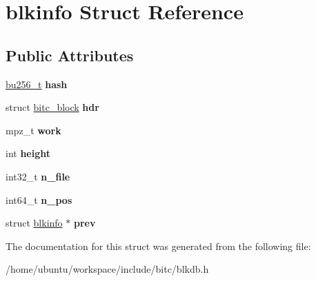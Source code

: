 \hypertarget{structblkinfo}{\section{blkinfo Struct Reference}
\label{structblkinfo}
}
\subsection*{Public Attributes}
\begin{DoxyCompactItemize}
\item 
\hypertarget{structblkinfo_acb979659f0946d2f6b89512f7b112e83}{\hyperlink{structbu256}{bu256\-\_\-t} {\bfseries hash}}\label{structblkinfo_acb979659f0946d2f6b89512f7b112e83}

\item 
\hypertarget{structblkinfo_ae323509169e136e40c53d9298d13818d}{struct \hyperlink{structbitc__block}{bitc\-\_\-block} {\bfseries hdr}}\label{structblkinfo_ae323509169e136e40c53d9298d13818d}

\item 
\hypertarget{structblkinfo_ac7b3f6aa68e8b3230fc1061e056b643f}{mpz\-\_\-t {\bfseries work}}\label{structblkinfo_ac7b3f6aa68e8b3230fc1061e056b643f}

\item 
\hypertarget{structblkinfo_a342e96e895940f919b7488d55d75d555}{int {\bfseries height}}\label{structblkinfo_a342e96e895940f919b7488d55d75d555}

\item 
\hypertarget{structblkinfo_a153d3e6b4c9f34d5b24cf5b612bbd83c}{int32\-\_\-t {\bfseries n\-\_\-file}}\label{structblkinfo_a153d3e6b4c9f34d5b24cf5b612bbd83c}

\item 
\hypertarget{structblkinfo_a81e082905848657b5e13f1b9c9a81e7e}{int64\-\_\-t {\bfseries n\-\_\-pos}}\label{structblkinfo_a81e082905848657b5e13f1b9c9a81e7e}

\item 
\hypertarget{structblkinfo_a2b1d04caa863f80fec9ceb46517cae30}{struct \hyperlink{structblkinfo}{blkinfo} $\ast$ {\bfseries prev}}\label{structblkinfo_a2b1d04caa863f80fec9ceb46517cae30}

\end{DoxyCompactItemize}


The documentation for this struct was generated from the following file\-:\begin{DoxyCompactItemize}
\item 
/home/ubuntu/workspace/include/bitc/blkdb.\-h\end{DoxyCompactItemize}
